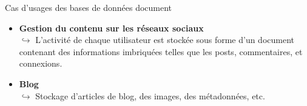 \begin{frame}{Cas d'usages des bases de données document}

    \begin{itemize}
        \item \textbf{Gestion du contenu sur les réseaux sociaux}\\
              $\hookrightarrow$ L'activité de chaque utilisateur est stockée
              sous forme d'un document contenant des informations imbriquées
              telles que les posts, commentaires, et connexions.
              \vspace{0.3cm}

        \item \textbf{Blog}\\
              $\hookrightarrow$ Stockage d'articles de blog, des images, des
              métadonnées, etc.
              \vspace{0.3cm}

    \end{itemize}

\end{frame}



